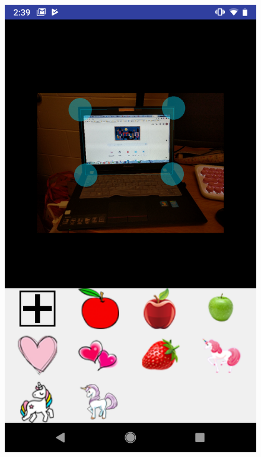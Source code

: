 \begin{figure}[htb]
\begin{minipage}[H]{0.3\textwidth}
\includegraphics[width=.95\textwidth]{section04/assets/GiftThransformExample.png}
\subcaption{\label{GiftThransformExample}}
\end{minipage}%
\begin{minipage}[H]{0.3\textwidth}

\end{minipage}
\end{figure}
